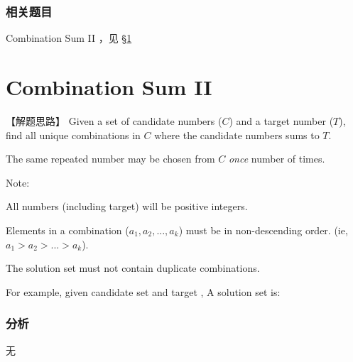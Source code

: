\subsubsection{相关题目}
\begindot
\item Combination Sum II ，见 \S \ref{sec:combination-sum-ii}
\myenddot


\section{Combination Sum II} %
\label{sec:combination-sum-ii}


【解题思路】
Given a set of candidate numbers ($C$) and a target number ($T$), find all unique combinations in $C$ where the candidate numbers sums to $T$.

The same repeated number may be chosen from $C$ \emph{once} number of times.

Note:
\begindot
\item All numbers (including target) will be positive integers.
\item Elements in a combination ($a_1, a_2, ..., a_k$) must be in non-descending order. (ie, $a_1 > a_2 > ... > a_k$).
\item The solution set must not contain duplicate combinations.
\myenddot

For example, given candidate set  and target , 
A solution set is: 
\begin{Code}
	[1, 7] 
	[1, 2, 5] 
	[2, 6] 
	[1, 1, 6]
\end{Code}


\subsubsection{分析}
无


